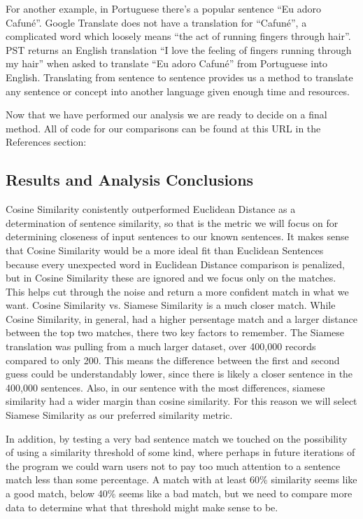 \documentclass[runningheads]{llncs}
\begin{document}
	For another example, in Portuguese there's a popular sentence ``Eu adoro Cafuné''. Google Translate does not have a translation for ``Cafuné'', a complicated word which loosely means ``the act of running fingers through hair''. PST returns an English translation ``I love the feeling of fingers running through my hair'' when asked to translate ``Eu adoro Cafuné'' from Portuguese into English. Translating from sentence to sentence provides us a method to translate any sentence or concept into another language given enough time and resources.

	Now that we have performed our analysis we are ready to decide on a final method. All of code for our comparisons can be found at this URL in the References section: ~\cite{ref_url20}
	
	\subsection{Results and Analysis Conclusions}
	Cosine Similarity conistently outperformed Euclidean Distance as a determination of sentence similarity, so that is the metric we will focus on for determining closeness of input sentences to our known sentences. It makes sense that Cosine Similarity would be a more ideal fit than Euclidean Sentences because every unexpected word in Euclidean Distance comparison is penalized, but in Cosine Similarity these are ignored and we focus only on the matches. This helps cut through the noise and return a more confident match in what we want. 
	Cosine Similarity vs. Siamese Similarity is a much closer match. While Cosine Similarity, in general, had a higher persentage match and a larger distance between the top two matches, there two key factors to remember. The Siamese translation was pulling from a much larger dataset, over 400,000 records compared to only 200. This means the difference between the first and second guess could be understandably lower, since there is likely a closer sentence in the 400,000 sentences. Also, in our sentence with the most differences, siamese similarity had a wider margin than cosine similarity. For this reason we will select Siamese Similarity as our preferred similarity metric.

	In addition, by testing a very bad sentence match we touched on the possibility of using a similarity threshold of some kind, where perhaps in future iterations of the program we could warn users not to pay too much attention to a sentence match less than some percentage. A match with at least 60\% similarity seems like a good match, below 40\% seems like a bad match, but we need to compare more data to determine what that threshold might make sense to be.
\end{document}
